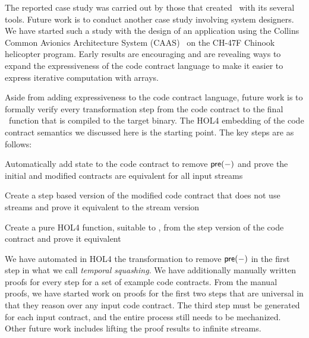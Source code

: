The reported case study was carried out by those that created \brfcs\ with its several tools. 
Future work is to conduct another case study involving system designers.
We have started such a study with the design of
an application using the Collins Common Avionics Architecture System
(CAAS)~\cite{caas} on the CH-47F Chinook helicopter program.
Early results are encouraging and are revealing ways to expand the expressiveness of the code contract language to make it easier to express iterative computation with arrays.

Aside from adding expressiveness to the code contract language, future work is to formally verify every transformation step from the code contract to the final \ckml\ function that is compiled to the target binary. 
The HOL4 embedding of the code contract semantics we discussed here is the starting point.
The key steps are as follows:
\begin{compactitem}
  \item Automatically add state to the code contract to remove $\mathsf{pre}(-)$ and prove the initial and modified contracts are equivalent for all input streams
  \item Create a step based version of the modified code contract that does not use streams and prove it equivalent to the stream version
  \item Create a pure HOL4 function, suitable to \ckml, from the step version of the code contract and prove it equivalent
\end{compactitem}
We have automated in HOL4 the transformation to remove $\mathsf{pre}(-)$ in the first step in what we call \emph{temporal squashing}.
We have additionally manually written proofs for every step for a set of example code contracts.
From the manual proofs, we have started work on proofs for the first two steps that are universal in that they reason over any input code contract.
The third step must be generated for each input contract, and the entire process still needs to be mechanized.
Other future work includes lifting the proof results to infinite streams.

